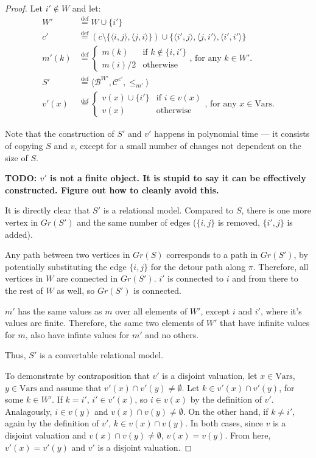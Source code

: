 \documentclass{article}
\newcommand{\B}{\mathcal{B}}
\newcommand{\Vars}{\text{Vars}}
\newcommand{\eqdef}{\stackrel{\text{def}}{=}}
\begin{document}
\begin{proof}
  Let $i' \not \in W$ and let:
\begin{align*}
W' &\eqdef W \cup \{i'\} \\
c' &\eqdef (c \setminus \{\langle i, j \rangle, \langle j, i \rangle\}) \cup \{\langle i', j \rangle, \langle j, i' \rangle, \langle i', i' \rangle\} \\
m'(k) &\eqdef \begin{cases}
m(k)           & \text{if $k \not \in \{i, i'\}$} \\
m(i) / 2       & \text{otherwise}
\end{cases}\text{, for any } k \in W'. \\
S' &\eqdef \langle \B^{W'}, \mathcal{C}^{c'}, \leq_{m'} \rangle \\
v'(x) &\eqdef \begin{cases}
  v(x) \cup \{i'\} & \text{if } i \in v(x) \\
  v(x)             & \text{otherwise}
\end{cases}\text{, for any } x \in \Vars.
\end{align*}

Note that the construction of $S'$ and $v'$ happens in polynomial time --- it consists of copying $S$ and $v$, except for a small number of changes not dependent on the size of $S$.

\textbf{TODO: $v'$ is not a finite object. It is stupid to say it can be effectively constructed. Figure out how to cleanly avoid this.}

It is directly clear that $S'$ is a relational model. Compared to $S$, there is one more vertex in $Gr(S')$ and the same number of edges ($\{i, j\}$ is removed, $\{i', j\}$ is added).

Any path between two vertices in $Gr(S)$ corresponds to a path in $Gr(S')$, by potentially substituting the edge $\{i, j\}$ for the detour path along $\pi$. Therefore, all vertices in $W$ are connected in $Gr(S')$. $i'$ is connected to $i$ and from there to the rest of $W$ as well, so $Gr(S')$ is connected.

$m'$ has the same values as $m$ over all elements of $W'$, except $i$ and $i'$, where it's values are finite. Therefore, the same two elements of $W'$ that have infinite values for $m$, also have infinte values for $m'$ and no others.

Thus, $S'$ is a convertable relational model.

To demonstrate by contraposition that $v'$ is a disjoint valuation, let $x \in \Vars$, $y \in \Vars$ and assume that $v'(x) \cap v'(y) \neq \emptyset$. Let $k \in v'(x) \cap v'(y)$, for some $k \in W'$. If $k = i'$, $i' \in v'(x)$, so $i \in v(x)$ by the definition of $v'$. Analagously, $i \in v(y)$ and $v(x) \cap v(y) \neq \emptyset$. On the other hand, if $k \neq i'$, again by the definition of $v'$, $k \in v(x) \cap v(y)$. In both cases, since $v$ is a disjoint valuation and $v(x) \cap v(y) \neq \emptyset$, $v(x) = v(y)$. From here, $v'(x) = v'(y)$ and $v'$ is a disjoint valuation.


\end{proof}
\end{document}
